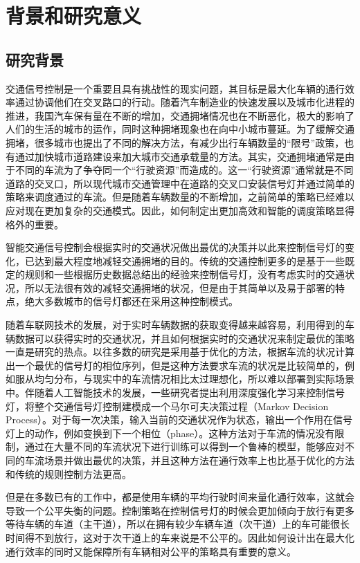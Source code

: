 
\chapter{背景和研究意义}
\section{研究背景}
交通信号控制是一个重要且具有挑战性的现实问题，其目标是最大化车辆的通行效率通过协调他们在交叉路口的行动。随着汽车制造业的快速发展以及城市化进程的推进，我国汽车保有量在不断的增加，交通拥堵情况也在不断恶化，极大的影响了人们的生活的城市的运作，同时这种拥堵现象也在向中小城市蔓延。为了缓解交通拥堵，很多城市也提出了不同的解决方法，有减少出行车辆数量的“限号”政策，也有通过加快城市道路建设来加大城市交通承载量的方法。其实，交通拥堵通常是由于不同的车流为了争夺同一个“行驶资源”而造成的。这一“行驶资源”通常就是不同道路的交叉口，所以现代城市交通管理中在道路的交叉口安装信号灯并通过简单的策略来调度通过的车流。但是随着车辆数量的不断增加，之前简单的策略已经难以应对现在更加复杂的交通模式。因此，如何制定出更加高效和智能的调度策略显得格外的重要。

智能交通信号控制会根据实时的交通状况做出最优的决策并以此来控制信号灯的变化，已达到最大程度地减轻交通拥堵的目的。传统的交通控制更多的是基于一些既定的规则和一些根据历史数据总结出的经验来控制信号灯，没有考虑实时的交通状况，所以无法很有效的减轻交通拥堵的状况，但是由于其简单以及易于部署的特点，绝大多数城市的信号灯都还在采用这种控制模式。

随着车联网技术的发展，对于实时车辆数据的获取变得越来越容易，利用得到的车辆数据可以获得实时的交通状况，并且如何根据实时的交通状况来制定最优的策略一直是研究的热点。以往多数的研究是采用基于优化的方法，根据车流的状况计算出一个最优的信号灯的相位序列，但是这种方法要求车流的状况是比较简单的，例如服从均匀分布，与现实中的车流情况相比太过理想化，所以难以部署到实际场景中。伴随着人工智能技术的发展，一些研究者提出利用深度强化学习来控制信号灯，将整个交通信号灯控制建模成一个马尔可夫决策过程（Markov Decision Process）。对于每一次决策，输入当前的交通状况作为状态，输出一个作用在信号灯上的动作，例如变换到下一个相位（phase）。这种方法对于车流的情况没有限制，通过在大量不同的车流状况下进行训练可以得到一个鲁棒的模型，能够应对不同的车流场景并做出最优的决策，并且这种方法在通行效率上也比基于优化的方法和传统的规则控制方法更高。

但是在多数已有的工作中，都是使用车辆的平均行驶时间来量化通行效率，这就会导致一个公平失衡的问题。控制策略在控制信号灯的时候会更加倾向于放行有更多等待车辆的车道（主干道），所以在拥有较少车辆车道（次干道）上的车可能很长时间得不到放行，这对于次干道上的车来说是不公平的。因此如何设计出在最大化通行效率的同时又能保障所有车辆相对公平的策略具有重要的意义。


